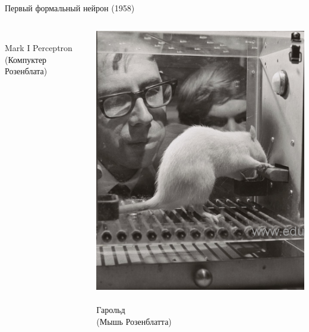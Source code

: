 \documentclass[notes,12pt, aspectratio=169]{beamer}
\begin{document}
\begin{frame}{Первый формальный нейрон (1958)}
\begin{columns}[T]
\begin{column}{.33\textwidth}
		\mbox{ } \\
		\color{blue}  Mark I Perceptron \\ (Компуктер Розенблата)
	\end{column}%
	\hfill%
	\begin{column}{.33\textwidth}
		\centering \includegraphics[scale=0.325]{rozen_mouse.png}\\
		\mbox{ } \\
		\color{blue}  Гарольд \\ (Мышь Розенблатта)
	\end{column}%
\end{columns}
\end{frame}
\end{document}
